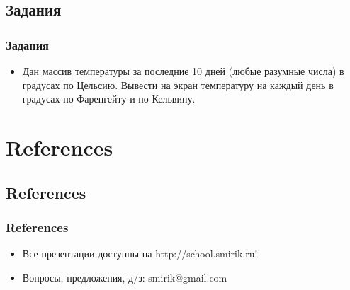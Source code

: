 \documentclass[compress,red]{beamer}
\begin{document}
\subsection{Задания}
\begin{frame}
  \frametitle{Задания}
  \begin{itemize}
    \item Дан массив температуры за последние 10 дней (любые разумные числа) в градусах по Цельсию. Вывести на экран температуру на каждый день в градусах по Фаренгейту и по Кельвину.
  \end{itemize}
\end{frame}

\section{References}
\subsection{References}
\begin{frame}[fragile]
  \frametitle{References}
  \begin{itemize}
    \item Все презентации доступны на http://school.smirik.ru!
    \item Вопросы, предложения, д/з: smirik@gmail.com
  \end{itemize}
\end{frame}
\end{document}
